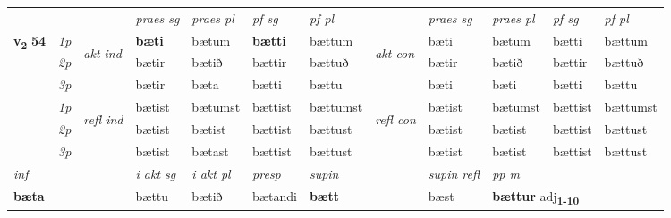 \begin{longtable}[l]{X>{\footnotesize\itshape}llXXXXlXXXX}
\midrule

 & &   & \textit{praes sg}  & \textit{praes pl}    & \textit{ pf sg} & \textit{pf pl} & & \textit{praes sg}  & \textit{praes pl}    & \textit{pf sg} & \textit{pf pl }  \\ \cmidrule{4-7} \cmidrule{9-12}
 \multirow{2}{*}{{{\textbf{v{\textsubscript{2}}} \Large{\textbf{54}}}}}  & 1p & \multirow{3}{*}{\begin{turn}{90}\textit{akt ind}\end{turn}} & \textbf{bæti} & bætum & \textbf{bætti} & bættum & \multirow{3}{*}{\begin{turn}{90}\textit{akt con}\end{turn}} &bæti & bætum & bætti & bættum\\*
 & 2p &  &  bætir  & bætið & bættir & bættuð & & bætir & bætið & bættir & bættuð \\*
 & 3p &  & bætir & bæta & bætti & bættu & & bæti & bæti& bætti & bættu \\*
\cmidrule{4-7} \cmidrule{9-12}
 & 1p & \multirow{3}{*}{\begin{turn}{90}\textit{refl ind}\end{turn}}  & bætist & bætumst & bættist & bættumst & \multirow{3}{*}{\begin{turn}{90}\textit{refl con}\end{turn}}  &bætist & bætumst & bættist & bættumst \\*
 & 2p &  & bætist & bætist & bættist & bættust & &bætist & bætist & bættist & bættust \\*
 & 3p  & & bætist & bætast & bættist & bættust & & bætist & bætist& bættist & bættust \\*
\cmidrule{4-7} \cmidrule{9-12}

   {\textit{inf}} & &  & \textit{i akt sg} & \textit{i akt pl}   & \textit{presp} & \textit{supin} && \textit{supin refl} & \textit{pp m} \\*
  {\textbf{bæta}} & && bættu  & bætið   & bætandi &  \textbf{bætt} && bæst & \multicolumn{2}{l}{\textbf{bættur} adj\textbf{\textsubscript{1-10}}} \\*

\midrule


\end{longtable}
